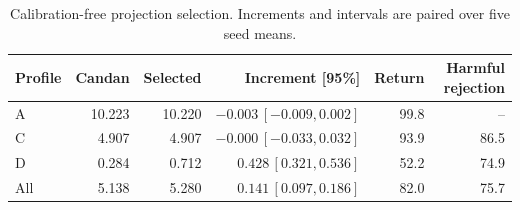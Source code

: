 \begin{table}[!ht]
\centering
\footnotesize
\caption{Calibration-free projection selection. Increments and intervals are paired over five seed means.}
\label{tab:supp_projection_protocol}
\begin{tabular}{lrrrrr}
\toprule
Profile & Candan & Selected & Increment [95\%] & Return & Harmful rejection \\
\midrule
A & 10.223 & 10.220 & $-0.003\,[-0.009,0.002]$ & 99.8 & -- \\
C & 4.907 & 4.907 & $-0.000\,[-0.033,0.032]$ & 93.9 & 86.5 \\
D & 0.284 & 0.712 & $0.428\,[0.321,0.536]$ & 52.2 & 74.9 \\
All & 5.138 & 5.280 & $0.141\,[0.097,0.186]$ & 82.0 & 75.7 \\
\bottomrule
\end{tabular}
\end{table}
